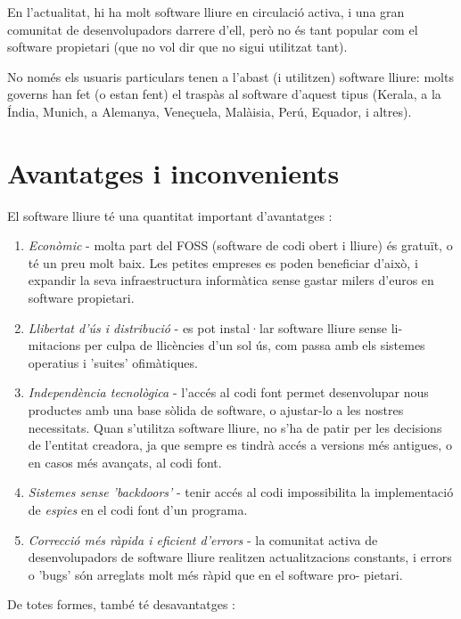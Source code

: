 En l'actualitat, hi ha molt software lliure en circulació activa, i una gran comunitat de desenvolupadors darrere d'ell, però no és tant popular com el software propietari (que no vol dir que no sigui utilitzat tant).

No només els usuaris particulars tenen a l'abast (i utilitzen) software lliure: molts governs han fet (o estan fent) el traspàs al software d'aquest tipus (Kerala, a la Índia, Munich, a Alemanya, Veneçuela, Malàisia, Perú, Equador, i altres). \cite{fossadopters}

\section{Avantatges i inconvenients}

El software lliure té una quantitat important d'avantatges  \cite{fossadvantages}:

\begin{enumerate}
\item \emph{Econòmic} - molta part del FOSS (software de codi obert i lliure) és gratuït, o té un preu molt baix. Les petites empreses es poden beneficiar d'això, i expandir la seva infraestructura informàtica sense gastar milers d'euros en software propietari.
\item \emph{Llibertat d'ús i distribució} - es pot instal·lar software lliure sense li- mitacions per culpa de llicències d'un sol ús, com passa amb els sistemes operatius i 'suites' ofimàtiques.
\item \emph{Independència tecnològica} - l'accés al codi font permet desenvolupar nous productes amb una base sòlida de software, o ajustar-lo a les nostres necessitats. Quan s'utilitza software lliure, no s'ha de patir per les decisions de l'entitat creadora, ja que sempre es tindrà accés a versions més antigues, o en casos més avançats, al codi font.
\item \emph{Sistemes sense 'backdoors'} - tenir accés al codi impossibilita la implementació de \emph{espies} en el codi font d'un programa.
\item \emph{Correcció més ràpida i eficient d'errors} - la comunitat activa de desenvolupadors de software lliure realitzen actualitzacions constants, i errors o 'bugs' són arreglats molt més ràpid que en el software pro- pietari.
\end{enumerate}

De totes formes, també té desavantatges \cite{gentegeek}:

